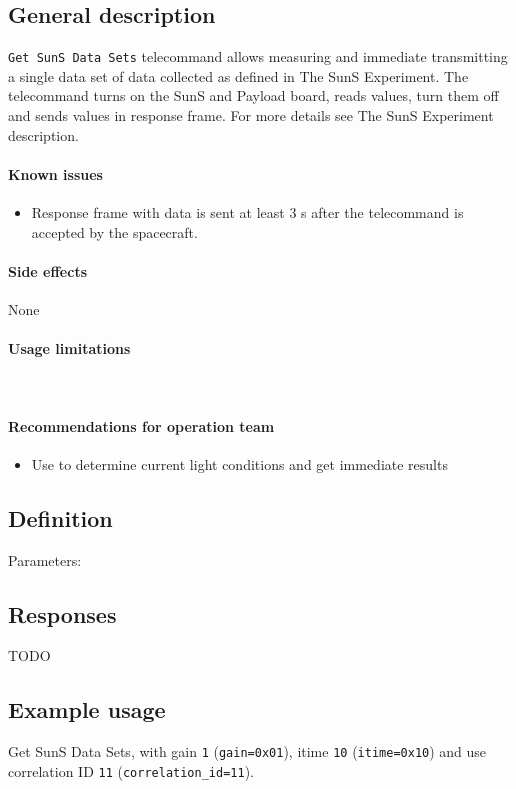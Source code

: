 

\subsection{General description}
\texttt{Get SunS Data Sets} telecommand allows measuring and immediate transmitting a single data set of data collected as defined in The SunS Experiment. The telecommand turns on the SunS and Payload board, reads values, turn them off and sends values in response frame. For more details see The SunS Experiment description.  

\paragraph{Known issues}
\begin{itemize}
    \item Response frame with data is sent at least 3 s after the telecommand is accepted by the spacecraft.
\end{itemize}

\paragraph{Side effects} 
None

\paragraph{Usage limitations} \mbox{} \\
\None

\paragraph{Recommendations for operation team}
\begin{itemize}
    \item Use to determine current light conditions and get immediate results
\end{itemize}

\subsection{Definition}

Parameters: 

\begin{tcarglist}   
\end{tcarglist}


\subsection{Responses}

TODO

\subsection{Example usage}
Get SunS Data Sets, with gain \texttt{1} (\texttt{gain=0x01}), itime \texttt{10} (\texttt{itime=0x10}) and use correlation ID \texttt{11} (\texttt{correlation\_id=11}).

